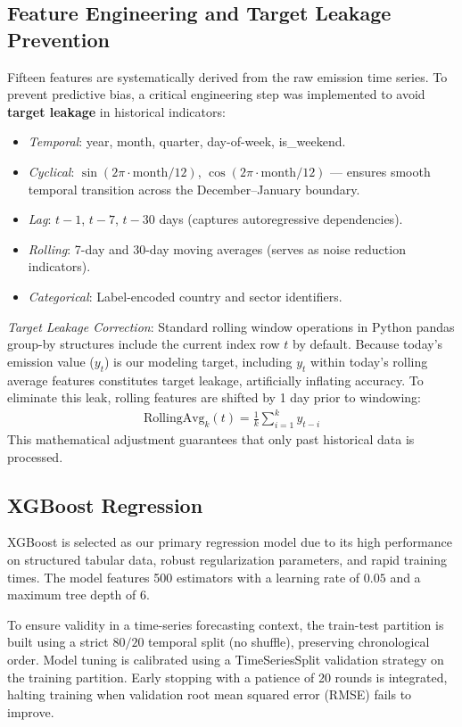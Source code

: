 \documentclass[conference]{IEEEtran}
\begin{document}
\subsection{Feature Engineering and Target Leakage Prevention}
Fifteen features are systematically derived from the raw emission time series. To prevent predictive bias, a critical engineering step was implemented to avoid \textbf{target leakage} in historical indicators:
\begin{itemize}
    \item \textit{Temporal}: year, month, quarter, day-of-week, is\_weekend.
    \item \textit{Cyclical}: $\sin(2\pi \cdot\text{month}/12)$, $\cos(2\pi \cdot\text{month}/12)$ — ensures smooth temporal transition across the December--January boundary.
    \item \textit{Lag}: $t-1$, $t-7$, $t-30$ days (captures autoregressive dependencies).
    \item \textit{Rolling}: 7-day and 30-day moving averages (serves as noise reduction indicators).
    \item \textit{Categorical}: Label-encoded country and sector identifiers.
\end{itemize}
\textit{Target Leakage Correction}: Standard rolling window operations in Python pandas group-by structures include the current index row $t$ by default. Because today's emission value ($y_t$) is our modeling target, including $y_t$ within today's rolling average features constitutes target leakage, artificially inflating accuracy. To eliminate this leak, rolling features are shifted by 1 day prior to windowing:
\begin{align}
\text{RollingAvg}_{k}(t) = \frac{1}{k} \sum_{i=1}^{k} y_{t-i}
\end{align}
This mathematical adjustment guarantees that only past historical data is processed.

\subsection{XGBoost Regression}
\label{sec:xgb_reg}
XGBoost \cite{xgboost2016} is selected as our primary regression model due to its high performance on structured tabular data, robust regularization parameters, and rapid training times. The model features 500 estimators with a learning rate of $0.05$ and a maximum tree depth of $6$. 

To ensure validity in a time-series forecasting context, the train-test partition is built using a strict $80/20$ temporal split (no shuffle), preserving chronological order. Model tuning is calibrated using a TimeSeriesSplit validation strategy on the training partition. Early stopping with a patience of 20 rounds is integrated, halting training when validation root mean squared error (RMSE) fails to improve.
\end{document}
